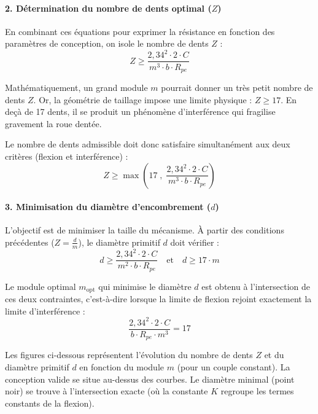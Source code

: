 \documentclass[11pt,a4paper]{article}
\begin{document}
\paragraph{2. Détermination du nombre de dents optimal ($Z$)}
En combinant ces équations pour exprimer la résistance en fonction des paramètres de conception, on isole le nombre de dents $Z$ :
\begin{equation}
    Z \ge \frac{2{,}34^2 \cdot 2 \cdot C}{m^3 \cdot b \cdot R_{pe}}
\end{equation}

\begin{tcolorbox}[colback=BoxBg, colframe=TealAccent, arc=4pt, boxrule=1pt, title=\textbf{Condition de non-interférence}]
Mathématiquement, un grand module $m$ pourrait donner un très petit nombre de dents $Z$. Or, la géométrie de taillage impose une limite physique : \textbf{$Z \ge 17$}. En deçà de 17 dents, il se produit un phénomène d'interférence qui fragilise gravement la roue dentée.
\end{tcolorbox}

Le nombre de dents admissible doit donc satisfaire simultanément aux deux critères (flexion et interférence) :
\begin{equation}
    Z \ge \max\left(17 \; , \; \frac{2{,}34^2 \cdot 2 \cdot C}{m^3 \cdot b \cdot R_{pe}}\right)
\end{equation}

\paragraph{3. Minimisation du diamètre d'encombrement ($d$)}
L'objectif est de minimiser la taille du mécanisme. À partir des conditions précédentes ($Z = \frac{d}{m}$), le diamètre primitif $d$ doit vérifier :
\begin{equation}
    d \ge \frac{2{,}34^2 \cdot 2 \cdot C}{m^2 \cdot b \cdot R_{pe}} \quad \text{et} \quad d \ge 17 \cdot m
\end{equation}

Le module optimal $m_{\text{opt}}$ qui minimise le diamètre $d$ est obtenu à l'intersection de ces deux contraintes, c'est-à-dire lorsque la limite de flexion rejoint exactement la limite d'interférence :
\begin{equation}
    \frac{2{,}34^2 \cdot 2 \cdot C}{b \cdot R_{pe} \cdot m^3} = 17
    \label{eq:m_opt_intersec}
\end{equation}

Les figures ci-dessous représentent l'évolution du nombre de dents $Z$ et du diamètre primitif $d$ en fonction du module $m$ (pour un couple constant). La conception valide se situe au-dessus des courbes. Le diamètre minimal (point noir) se trouve à l'intersection exacte (où la constante $K$ regroupe les termes constants de la flexion).
\end{document}

